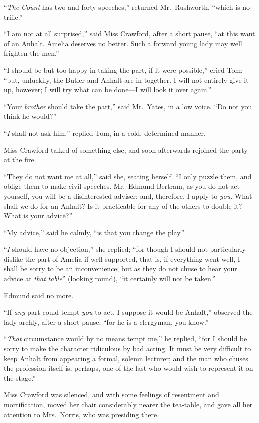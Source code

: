 \documentclass{article}
\begin{document}
``\emph{The} \emph{Count} has two-and-forty speeches,''
returned Mr.\ Rushworth, ``which is no trifle.''

``I am not at all surprised,'' said Miss Crawford,
after a short pause, ``at this want of an Anhalt.
Amelia deserves no better.  Such a forward young lady
may well frighten the men.''

``I should be but too happy in taking the part, if it
were possible,'' cried Tom; ``but, unluckily, the Butler
and Anhalt are in together.  I will not entirely give
it up, however; I will try what can be done---I will look
it over again.''

``Your \emph{brother} should take the part,'' said Mr.\ Yates,
in a low voice.  ``Do not you think he would?''

``\emph{I} shall not ask him,'' replied Tom, in a cold,
determined manner.

Miss Crawford talked of something else, and soon afterwards
rejoined the party at the fire.

``They do not want me at all,'' said she, seating herself.
``I only puzzle them, and oblige them to make civil speeches.
Mr.\ Edmund Bertram, as you do not act yourself,
you will be a disinterested adviser; and, therefore,
I apply to \emph{you}.  What shall we do for an Anhalt?
Is it practicable for any of the others to double it?
What is your advice?''

``My advice,'' said he calmly, ``is that you change the play.''

``\emph{I} should have no objection,'' she replied; ``for though
I should not particularly dislike the part of Amelia
if well supported, that is, if everything went well,
I shall be sorry to be an inconvenience; but as they
do not chuse to hear your advice at \emph{that} \emph{table}''
(looking round), ``it certainly will not be taken.''

Edmund said no more.

``If \emph{any} part could tempt \emph{you} to act, I suppose it would
be Anhalt,'' observed the lady archly, after a short pause;
``for he is a clergyman, you know.''

``\emph{That} circumstance would by no means tempt me,''
he replied, ``for I should be sorry to make the character
ridiculous by bad acting.  It must be very difficult
to keep Anhalt from appearing a formal, solemn lecturer;
and the man who chuses the profession itself is, perhaps,
one of the last who would wish to represent it on the stage.''

Miss Crawford was silenced, and with some feelings of resentment
and mortification, moved her chair considerably nearer the
tea-table, and gave all her attention to Mrs.\ Norris, who was
presiding there.
\end{document}
